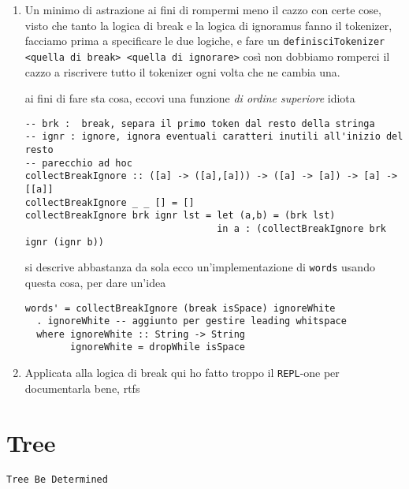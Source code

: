 \documentclass[11pt]{article}
\begin{document}
\begin{enumerate}
\item Un minimo di astrazione
\label{sec:orgaa0480a}
ai fini di rompermi meno il cazzo con certe cose, visto che tanto la logica di break e la logica di ignoramus fanno il tokenizer, facciamo prima a specificare le due logiche, e fare un \texttt{definisciTokenizer <quella di break> <quella di ignorare>}
così non dobbiamo romperci il cazzo a riscrivere tutto il tokenizer ogni volta che ne cambia una.

ai fini di fare sta cosa, eccovi una funzione \emph{di ordine superiore} idiota
\begin{verbatim}
-- brk :  break, separa il primo token dal resto della stringa
-- ignr : ignore, ignora eventuali caratteri inutili all'inizio del resto
-- parecchio ad hoc
collectBreakIgnore :: ([a] -> ([a],[a])) -> ([a] -> [a]) -> [a] -> [[a]]
collectBreakIgnore _ _ [] = []
collectBreakIgnore brk ignr lst = let (a,b) = (brk lst)
                                  in a : (collectBreakIgnore brk ignr (ignr b))
\end{verbatim}

si descrive abbastanza da sola
ecco un'implementazione di \texttt{words} usando questa cosa, per dare un'idea

\begin{verbatim}
words' = collectBreakIgnore (break isSpace) ignoreWhite
  . ignoreWhite -- aggiunto per gestire leading whitspace
  where ignoreWhite :: String -> String 
        ignoreWhite = dropWhile isSpace
\end{verbatim}

\item Applicata alla logica di break
\label{sec:orgc7c3fcb}
qui ho fatto troppo il \texttt{REPL}-one per documentarla bene, rtfs
\end{enumerate}

\section{Tree}
\label{sec:orge537b53}
\texttt{Tree Be Determined}
\end{document}
